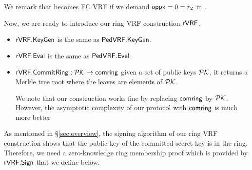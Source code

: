 \noindent We remark that \PedVRF becomes EC VRF if we demand $\mathsf{oppk} = 0 = r_2$ in \Sign.


\smallskip

Now, we are ready to introduce our ring VRF construction  $ {\mathsf{rVRF}} $.

\begin{itemize}
	\item ${\mathsf{rVRF}}.{\mathsf{KeyGen}} $ is the same as $ {\mathsf{PedVRF}}.{\mathsf{KeyGen}}$.
	\item ${\mathsf{rVRF}}.{\mathsf{Eval}} $ is the same as $ {\mathsf{PedVRF}}.{\mathsf{Eval}}$.
	\item $ {\mathsf{rVRF}}.{\mathsf{CommitRing}}: {\mathcal{PK}} \rightarrow \mathsf{comring}$ given a set of public keys $ {\mathcal{PK}} $, it returns a Merkle tree root where the leaves are elements of  $ {\mathcal{PK}}$. 
	
	We note that our construction works fine by replacing  $ \mathsf{comring} $ by $ {\mathcal{PK}} $. However, the asymptotic complexity of our protocol with $ \mathsf{comring} $ is much more better
	
\end{itemize}


	As mentioned in \S\ref{sec:overview}, the signing algorithm of our ring VRF construction shows that the public key of the committed secret key is in the ring. Therefore, we need a zero-knowledge ring membership proof which is provided by $ {\mathsf{rVRF}}.{\mathsf{Sign}} $ that we define below.
%	
	
